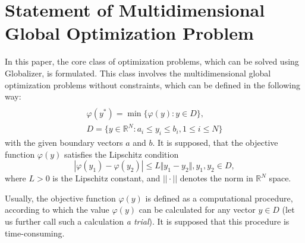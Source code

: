 \documentclass{svproc}
\begin{document}
\section{Statement of Multidimensional Global Optimization Problem}
In this paper, the core class of optimization problems, which can be solved using
Globalizer, is formulated. This class involves the multidimensional global
optimization problems without constraints, which can be defined in the following way:
\begin{equation}
\label{eq:task}
\begin{array}{cr}\\
  \varphi(y^*)=\min\{\varphi(y):y\in D\}, \\
  D=\{y\in \mathbb{R}^N:a_i\leq y_i\leq{b_i}, 1\leq{i}\leq{N}\}
\end{array}
\end{equation}
with the given boundary vectors  $a$ and  $b$. It is supposed, that the objective function
\(\varphi(y)\) satisfies the Lipschitz condition
\begin{equation}
\label{eq:lip}
|\varphi(y_1)-\varphi(y_2)|\leq L\Vert y_1-y_2\Vert,y_1,y_2\in D,
\end{equation}
where \(L>0\) is the Lipschitz constant, and \(||\cdot||\) denotes the norm in \(\mathbb{R}^N\)
space.
\par
Usually, the objective function \(\varphi(y)\) is defined as a computational procedure,
according to which the value \(\varphi(y)\) can be calculated for any vector \(y\in D\)
(let us further call such a calculation \textit{a trial}). It is supposed that this procedure
is time-consuming.
\end{document}
